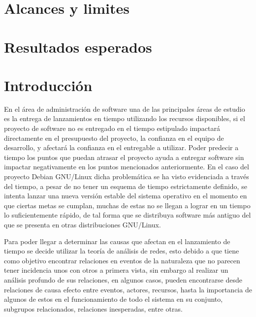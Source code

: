 \documentclass[12pt]{report}
\begin{document}
\chapter*{Alcances y limites}

\chapter*{Resultados esperados}


\chapter*{Introducción}En  el área de administración  de software una
de las principales  áreas de estudio es la entrega  de lanzamientos en
tiempo  utilizando los  recursos  disponibles,  si el  proyecto  de
software   no  es   entregado  en   el  tiempo   estipulado  impactará
directamente en el presupuesto del proyecto, la confianza en el equipo
de  desarrollo,   y  afectará   la  confianza   en  el   entregable  a
utilizar. Poder  predecir a  tiempo los puntos  que puedan  atrasar el
proyecto ayuda a entregar software sin impactar negativamente en
los puntos mencionados  anteriormente. En el caso  del proyecto Debian
GNU/Linux  dicha problemática  se ha  visto evidenciada  a través  del
tiempo,  a  pesar de  no  tener  un  esquema de  tiempo  estrictamente
definido,  se intenta  lanzar una  nueva versión  estable del  sistema
operativo en  el momento en  que ciertas  metas se cumplan,  muchas de
estas no se llegan a lograr en un tiempo lo suficientemente rápido, de
tal forma que  se distribuya software más antiguo del  que se presenta
en otras distribuciones GNU/Linux.

Para  poder  llegar  a  determinar   las  causas  que  afectan  en  el
lanzamiento  de tiempo  se decide  utilizar la  teoría de  análisis de
redes, esto debido  a que tiene como objetivo  encontrar relaciones en
eventos  de la  naturaleza que  no parecen  tener incidencia  unos con
otros a primera vista, sin embargo al realizar un análisis profundo de
sus relaciones, en algunos  casos, pueden encontrarse desde relaciones
de causa efecto entre eventos, actores, recursos, hasta la importancia
de algunos  de estos  en el  funcionamiento de todo  el sistema  en su
conjunto, subgrupos relacionados, relaciones inesperadas, entre otras.
\end{document}
